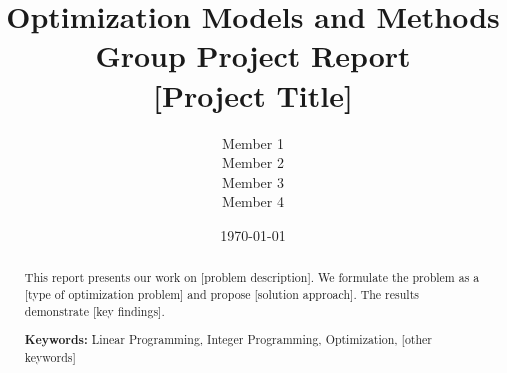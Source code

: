 \documentclass[12pt,a4paper]{article}
\title{Optimization Models and Methods\\
Group Project Report\\
\vspace{0.5cm}
\large [Project Title]}
\author{
    Member 1 \\
    Member 2 \\
    Member 3 \\
    Member 4
}
\date{\today}
\begin{document}
\maketitle

\begin{abstract}
This report presents our work on [problem description]. We formulate the problem as a [type of optimization problem] and propose [solution approach]. The results demonstrate [key findings].

\textbf{Keywords:} Linear Programming, Integer Programming, Optimization, [other keywords]
\end{abstract}

\tableofcontents
\newpage









\end{document}

